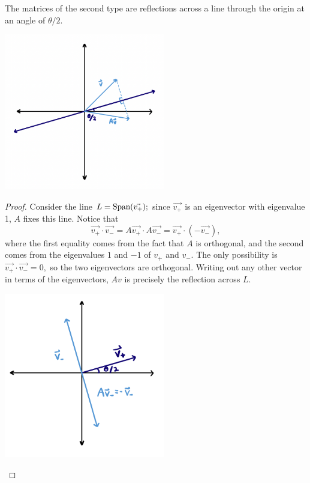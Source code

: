 \begin{theorem}
    The matrices of the second type are reflections across a line through the origin at an angle of $\theta/2$.
    
    \begin{center}
    \includegraphics[width=7cm]{Lecture Files and Images/lec12-2.png}
\end{center}
\end{theorem}
\begin{proof}
Consider the line $L = \text{Span}(\vec{v_+});$ since $\vec{v_+}$ is an eigenvector with eigenvalue 1, $A$ fixes this line. Notice that \[\vec{v_+} \cdot \vec{v_-} = A\vec{v_+} \cdot A \vec{v_-} = \vec{v_+} \cdot (-\vec{v_-}),\] where the first equality comes from the fact that $A$ is orthogonal, and the second comes from the eigenvalues $1$ and $-1$ of $v_+$ and $v_-$. The only possibility is $\vec{v_+} \cdot \vec{v_-}  = 0,$ so the two eigenvectors are orthogonal. Writing out any other vector in terms of the eigenvectors, $Av$ is precisely the reflection across $L$. 

\begin{center}
    \includegraphics[width=7cm]{Lecture Files and Images/lec12-3.png}
\end{center}

\end{proof}

